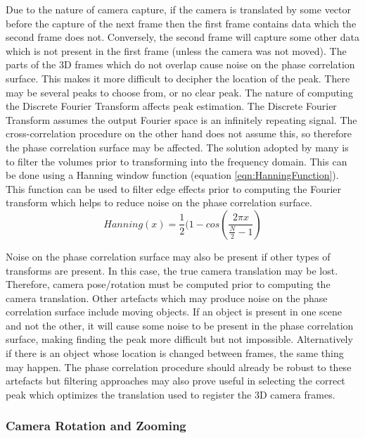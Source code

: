Due to the nature of camera capture, if the camera is translated by some vector before the capture of the next frame then the first frame contains data which the second frame does not. Conversely, the second frame will capture some other data which is not present in the first frame (unless the camera was not moved). The parts of the 3D frames which do not overlap cause noise on the phase correlation surface. This makes it more difficult to decipher the location of the peak. There may be several peaks to choose from, or no clear peak. The nature of computing the Discrete Fourier Transform affects peak estimation. The Discrete Fourier Transform assumes the output Fourier space is an infinitely repeating signal. The cross-correlation procedure on the other hand does not assume this, so therefore the phase correlation surface may be affected. The solution adopted by many is to filter the volumes prior to transforming into the frequency domain. This can be done using a Hanning window function (equation \ref{eqn:HanningFunction}). This function can be used to filter edge effects prior to computing the Fourier transform which helps to reduce noise on the phase correlation surface. \\

\begin{equation} \label{eqn:HanningFunction}
Hanning(x) = \frac{1}{2}(1 - cos\left(\frac{2\pi x}{\frac{N}{2} - 1}\right)
\end{equation}

Noise on the phase correlation surface may also be present if other types of transforms are present. In this case, the true camera translation may be lost. Therefore, camera pose/rotation must be computed prior to computing the camera translation. Other artefacts which may produce noise on the phase correlation surface include moving objects. If an object is present in one scene and not the other, it will cause some noise to be present in the phase correlation surface, making finding the peak more difficult but not impossible. Alternatively if there is an object whose location is changed between frames, the same thing may happen. The phase correlation procedure should already be robust to these artefacts but filtering approaches may also prove useful in selecting the correct peak which optimizes the translation used to register the 3D camera frames. \\

\subsubsection{Camera Rotation and Zooming}
\label{Sec:RoteZoomingSection}

